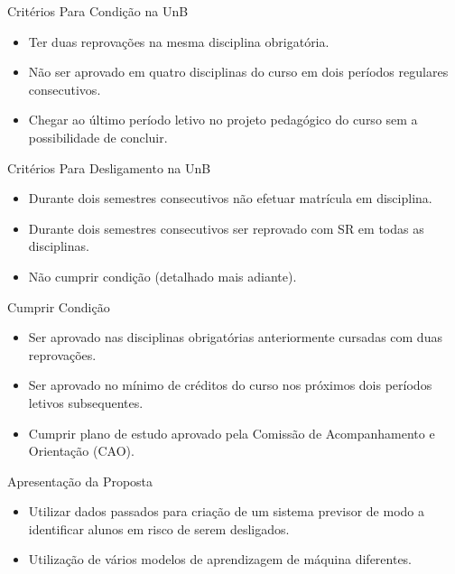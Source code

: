 \begin{frame}{Critérios Para Condição na UnB}
    \begin{itemize}[itemsep=3ex]
        \item Ter duas reprovações na mesma disciplina obrigatória.
        \item Não ser aprovado em quatro disciplinas do curso em dois períodos
            regulares consecutivos.
        \item Chegar ao último período letivo no projeto pedagógico do curso sem a
            possibilidade de concluir.
    \end{itemize}
\end{frame}

\begin{frame}{Critérios Para Desligamento na UnB}
    \begin{itemize}[itemsep=3ex]
        \item Durante dois semestres consecutivos não efetuar matrícula em disciplina. 
        \item Durante dois semestres consecutivos ser reprovado com SR em todas as
   disciplinas. 
        \item Não cumprir condição (detalhado mais adiante).
    \end{itemize}
\end{frame}

\begin{frame}{Cumprir Condição}
    \begin{itemize}[itemsep=3ex]
         \item Ser aprovado nas disciplinas obrigatórias anteriormente cursadas com
             duas reprovações. 
         \item Ser aprovado no mínimo de créditos do curso nos próximos dois períodos
             letivos subsequentes.
         \item Cumprir plano de estudo aprovado pela Comissão de Acompanhamento e
             Orientação (CAO).
    \end{itemize}
\end{frame}


\begin{frame}{Apresentação da Proposta}
    \begin{itemize}[itemsep=3ex]
        \item Utilizar dados passados para criação de um sistema previsor de modo a 
            identificar alunos em risco de serem desligados. 
        \item Utilização de vários modelos de aprendizagem de máquina diferentes.
    \end{itemize}
\end{frame}

